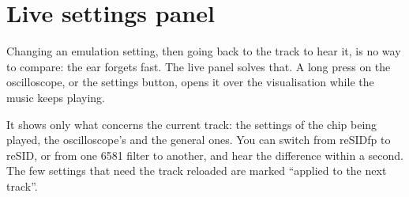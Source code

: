 \chapter{Live settings panel}
Changing an emulation setting, then going back to the track to hear it, is no way to compare: the ear forgets fast.
The live panel solves that. A long press on the oscilloscope, or the settings button, opens it over the
visualisation while the music keeps playing.

It shows only what concerns the current track: the settings of the chip being played, the oscilloscope's and the
general ones. You can switch from reSIDfp to reSID, or from one 6581 filter to another, and hear the difference
within a second. The few settings that need the track reloaded are marked ``applied to the next track''.
